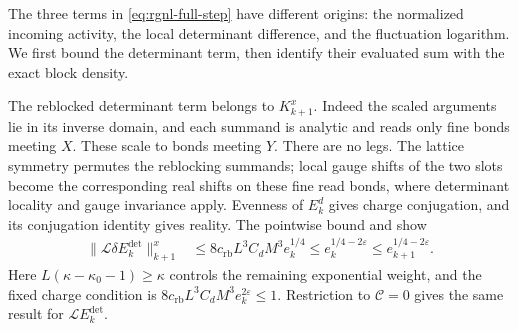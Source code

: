 The three terms in \eqref{eq:rgnl-full-step} have different origins:
the normalized incoming activity, the local determinant difference,
and the fluctuation logarithm. We first bound the determinant term,
then identify their evaluated sum with the exact block density.

The reblocked determinant term belongs to $K_{k+1}^x$.
Indeed the scaled arguments lie in its inverse domain,
and each summand is analytic and reads only fine
bonds meeting $X$. These scale to bonds meeting $Y$.
There are no legs. The lattice symmetry permutes the
reblocking summands; local gauge shifts of the two
slots become the corresponding real shifts on these
fine read bonds, where determinant locality and gauge
invariance apply. Evenness of $E_k^d$ gives charge
conjugation, and its conjugation identity gives reality.
The pointwise bound
 and
 show
\begin{align}
 \|\mathcal L\delta E_k^{\mathrm{det}}\|_{k+1}^x
    &\le8c_{\mathrm{rb}}L^3C_dM^3e_k^{1/4}
      \le e_k^{1/4-2\varepsilon}
      \le e_{k+1}^{1/4-2\varepsilon}.
                                      \label{eq:rgnl-reblocked-determinant}
\end{align}
Here $L(\kappa-\kappa_0-1)\ge\kappa$ controls the
remaining exponential weight, and the fixed charge
condition is
$8c_{\mathrm{rb}}L^3C_dM^3e_k^{2\varepsilon}\le1$.
Restriction to $\mathscr C=0$ gives the same result
for $\mathcal LE_k^{\mathrm{det}}$.

